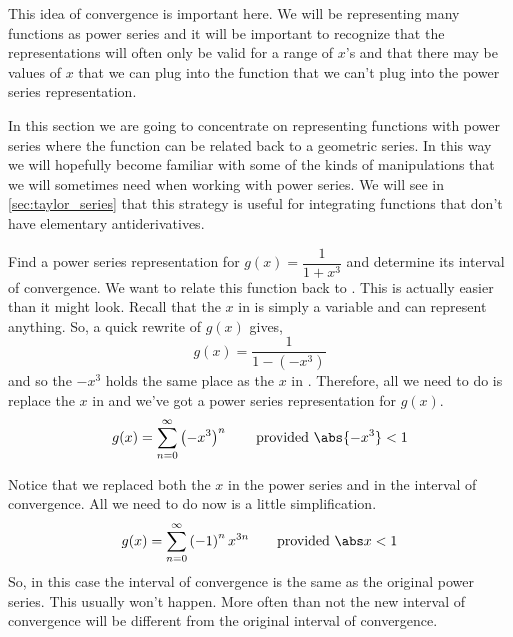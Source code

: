 This idea of convergence is important here.  We will be representing many functions as power series and it will be important to recognize that the representations will often only be valid for a range of $x$'s and that there may be values of $x$ that we can plug into the function that we can't plug into the power series representation.

In this section we are going to concentrate on representing functions with power series where the function can be related back to a geometric series. In this way we will hopefully become familiar with some of the kinds of manipulations that we will sometimes need when working with power series. We will see in \autoref{sec:taylor_series} that this strategy is useful for integrating functions that don't have elementary antiderivatives.



\begin{example}\label{ex_power_cube}
Find a power series representation for $g(x) = \dfrac1{1+x^3}$ and determine its interval of convergence.
\solution
We want to relate this function back to .  This is actually easier than it might look.  Recall that the $x$ in  is simply a variable and can represent anything.  So, a quick rewrite of $g(x)$ gives,
\[g(x)=\frac1{1-(-x^3)}\]
and so the $-x^3$ holds the same place as the $x$ in .  Therefore, all we need to do is replace the $x$ in  and we've got a power series representation for $g(x)$.  
\[g(x)=\sum_{n=0}^{\infty}\left( -x^3 \right)^n \qquad \text{provided }\abs{-x^3}<1\]

Notice that we replaced both the $x$ in the power series and in the interval of convergence. All we need to do now is a little simplification.
\[g(x)=\sum_{n=0}^{\infty}\left( -1 \right)^n x^{3n} \qquad\text{provided }\abs x<1\]
So, in this case the interval of convergence is the same as the original power series.  This usually won't happen.  More often than not the new interval of convergence will be different from the original interval of convergence.
\end{example}

